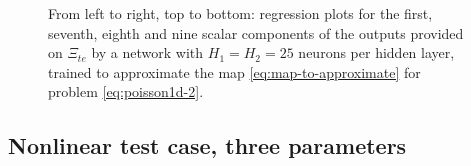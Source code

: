 \documentclass[12pt, a4paper, twoside, openright, notitlepage]{report}
\numberwithin{equation}{chapter}
\theoremstyle{theorem}
\theoremstyle{definition}
\theoremstyle{remark}
\theoremstyle{proposition}
\numberwithin{figure}{chapter}
\begin{document}
\begin{figure}[t!]
			
			\caption{From left to right, top to bottom: regression plots for the first, seventh, eighth and nine scalar components of the outputs provided on $\Xi_{te}$ by a network with $H_1 = H_2 = 25$ neurons per hidden layer, trained to approximate the map \eqref{eq:map-to-approximate} for problem \eqref{eq:poisson1d-2}.}
			\label{fig:poisson1d-2-fig3}
		\end{figure}
			
	\subsection{Nonlinear test case, three parameters}
	\label{section:poisson1d-3}
	
\end{document}
